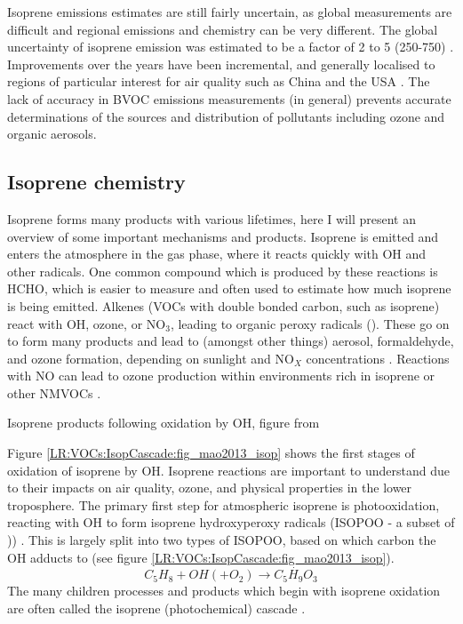     Isoprene emissions estimates are still fairly uncertain, as global measurements are difficult and regional emissions and chemistry can be very different.
    The global uncertainty of isoprene emission was estimated to be a factor of 2 to 5 (250-750\tgpyr) \parencite{Kanakidou2005}.
    Improvements over the years have been incremental, and generally localised to regions of particular interest for air quality such as China and the USA \parencite{Guenther2012,Jiang2018}.
    The lack of accuracy in BVOC emissions measurements (in general) prevents accurate determinations of the sources and distribution of pollutants including ozone and organic aerosols.
    
    
  \subsection{Isoprene chemistry}
    \label{LR:VOCs:IsopCascade}
    
    Isoprene forms many products with various lifetimes, here I will present an overview of some important mechanisms and products.
    Isoprene is emitted and enters the atmosphere in the gas phase, where it reacts quickly with OH and other radicals.
    One common compound which is produced by these reactions is HCHO, which is easier to measure and often used to estimate how much isoprene is being emitted.
    Alkenes (VOCs with double bonded carbon, such as isoprene) react with OH, ozone, or NO$_3$, leading to organic peroxy radicals (\roo).
    These go on to form many products and lead to (amongst other things) aerosol, formaldehyde, and ozone formation, depending on sunlight and NO$_X$ concentrations \parencite{Atkinson2000}.
    Reactions with NO can lead to ozone production within environments rich in isoprene or other NMVOCs \parencite{Patchen2007,AtkinsonArey2003}.
    
      {Isoprene products following oxidation by OH, figure from \textcite{Mao2013}}
      {\label{LR:VOCs:IsopCascade:fig_mao2013_isop}}
    
    Figure \ref{LR:VOCs:IsopCascade:fig_mao2013_isop} shows the first stages of oxidation of isoprene by OH.
    Isoprene reactions are important to understand due to their impacts on air quality, ozone, and physical properties in the lower troposphere.
    The primary first step for atmospheric isoprene is photooxidation, reacting with OH to form isoprene hydroxyperoxy radicals (ISOPOO - a subset of \roo)) \parencite{Wolfe2016,Marvin2017,Patchen2017}.
    This is largely split into two types of ISOPOO, based on which carbon the OH adducts to (see figure \ref{LR:VOCs:IsopCascade:fig_mao2013_isop}).
    \begin{equation} \label{LR:VOCs:IsopCascade:eqn_IsopToIsopoo}
    C_5H_8 + OH (+ O_2) \rightarrow \dot{C_5H_9O_3}
    \end{equation}
    The many children processes and products which begin with isoprene oxidation are often called the isoprene (photochemical) cascade \parencite[eg.][]{Crounse2012,Paulot2012,Wolfe2016}.
    
